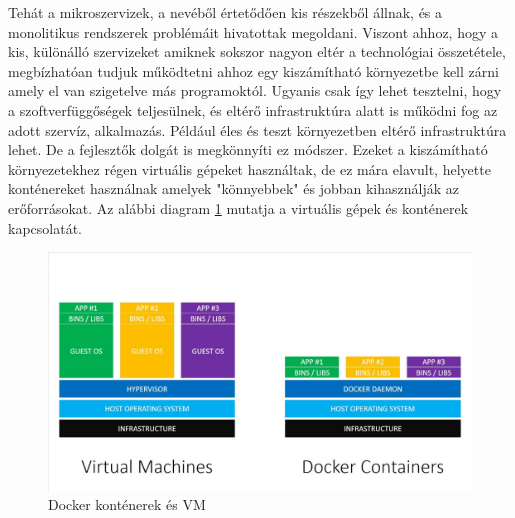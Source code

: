 Tehát a mikroszervizek, a nevéből értetődően kis részekből állnak, és a monolitikus rendszerek problémáit hivatottak megoldani.
Viszont ahhoz, hogy a kis, különálló szervizeket amiknek sokszor nagyon eltér a technológiai összetétele, megbízhatóan tudjuk működtetni ahhoz egy kiszámítható környezetbe kell zárni amely el van szigetelve más programoktól.
Ugyanis csak így lehet tesztelni, hogy a szoftverfüggőségek teljesülnek, és eltérő infrastruktúra alatt is működni fog az adott szervíz, alkalmazás.
Például éles és teszt környezetben eltérő infrastruktúra lehet.
De a fejlesztők dolgát is megkönnyíti ez módszer.
Ezeket a kiszámítható környezetekhez régen virtuális gépeket használtak, de ez mára elavult, helyette konténereket használnak amelyek "könnyebbek" és jobban kihasználják az erőforrásokat.
Az alábbi diagram \ref{fig:docker-vm} mutatja a virtuális gépek és konténerek kapcsolatát.

\begin{figure}
    \centering
    \includegraphics[scale=0.3]{images/docker-vs-vms.jpg}
    \caption{Docker konténerek és VM}
    \label{fig:docker-vm}
\end{figure}
